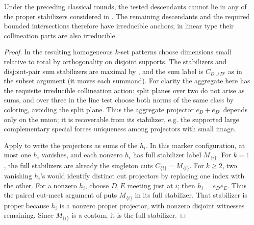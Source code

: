 \begin{proposition}\label{fa:projector-exclusion}
Under the preceding classical rounds, the tested descendants cannot lie in any of the proper stabilizers
considered in .  The remaining descendants and the required bounded
intersections therefore have irreducible anchors; in linear type their collineation parts are also
irreducible.
\end{proposition}

\begin{proof}

In the resulting homogeneous \(k\)-set patterns choose dimensions small relative to total by
orthogonality on disjoint supports. The stabilizers and disjoint-pair sum stabilizers are maximal by
, and the sum label is \(C_{D\cup D'}\) as in the subset argument (it moves
each summand). For clarity the aggregate here has the requisite irreducible collineation action: split
planes over two do not arise as sums, and over three in the line test choose both norms of the same class
by coloring, avoiding the split plane. Thus the aggregate projector \(e_D+e_{D'}\) depends only on the
union; it is recoverable from its stabilizer, e.g. the supported large complementary special forces
uniqueness among projectors with small image.

Apply  to write the projectors as sums of the \(h_i\).
In this marker configuration, at most one \(h_i\) vanishes,
and each nonzero \(h_i\) has full stabilizer label \(M_{\{i\}}\).
For \(k=1\), the full stabilizers are already the singleton
cuts \(C_{\{i\}}=M_{\{i\}}\). For \(k\ge2\), two vanishing
\(h_i\)'s would identify distinct cut projectors by replacing one index
with the other. For a nonzero \(h_i\), choose \(D,E\) meeting just
at \(i\); then \(h_i=e_De_E\). Thus the paired cut-meet argument
of  puts \(M_{\{i\}}\) in its full stabilizer.
That stabilizer is proper because \(h_i\) is a nonzero proper
projector, with nonzero disjoint witnesses remaining. Since
\(M_{\{i\}}\) is a coatom, it is the full stabilizer.


\end{proof}
